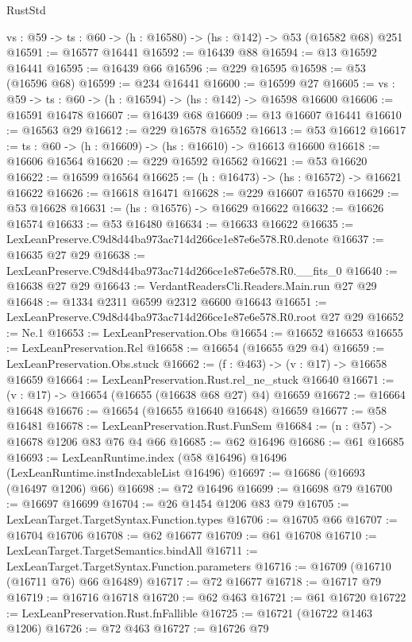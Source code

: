 \begin{lexlean}{RustStd}
\begin{coremodule}
  {vs : @59} -> {ts : @60} -> (h : @16580) -> (hs : @142) -> @53 (@16582 @68) @251
@16591 := @16577 @16441
@16592 := @16439 @88
@16594 := @13 @16592 @16441
@16595 := @16439 @66
@16596 := @229 @16595
@16598 := @53 (@16596 @68)
@16599 := @234 @16441
@16600 := @16599 @27
@16605 := {vs : @59} -> {ts : @60} -> (h : @16594) -> (hs : @142) -> @16598 @16600
@16606 := @16591 @16478
@16607 := @16439 @68
@16609 := @13 @16607 @16441
@16610 := @16563 @29
@16612 := @229 @16578 @16552
@16613 := @53 @16612
@16617 := {ts : @60} -> (h : @16609) -> (hs : @16610) -> @16613 @16600
@16618 := @16606 @16564
@16620 := @229 @16592 @16562
@16621 := @53 @16620
@16622 := @16599 @16564
@16625 := (h : @16473) -> (hs : @16572) -> @16621 @16622
@16626 := @16618 @16471
@16628 := @229 @16607 @16570
@16629 := @53 @16628
@16631 := (hs : @16576) -> @16629 @16622
@16632 := @16626 @16574
@16633 := @53 @16480
@16634 := @16633 @16622
@16635 := LexLeanPreserve.C9d8d44ba973ac714d266ce1e87e6e578.R0.denote
@16637 := @16635 @27 @29
@16638 := LexLeanPreserve.C9d8d44ba973ac714d266ce1e87e6e578.R0.__fits_0
@16640 := @16638 @27 @29
@16643 := VerdantReadersCli.Readers.Main.run @27 @29
@16648 := @1334 @2311 @6599 @2312 @6600 @16643
@16651 := LexLeanPreserve.C9d8d44ba973ac714d266ce1e87e6e578.R0.root @27 @29
@16652 := Ne.{1}
@16653 := LexLeanPreservation.Obs
@16654 := @16652 @16653
@16655 := LexLeanPreservation.Rel
@16658 := @16654 (@16655 @29 @4)
@16659 := LexLeanPreservation.Obs.stuck
@16662 := (f : @463) -> (v : @17) -> @16658 @16659
@16664 := LexLeanPreservation.Rust.rel_ne_stuck @16640
@16671 := (v : @17) -> @16654 (@16655 (@16638 @68 @27) @4) @16659
@16672 := @16664 @16648
@16676 := @16654 (@16655 @16640 @16648) @16659
@16677 := @58 @16481
@16678 := LexLeanPreservation.Rust.FunSem
@16684 := (n : @57) -> @16678 @1206 @83 @76 @4 @66
@16685 := @62 @16496
@16686 := @61 @16685
@16693 := LexLeanRuntime.index (@58 @16496) @16496 (LexLeanRuntime.instIndexableList @16496)
@16697 := @16686 (@16693 (@16497 @1206) @66)
@16698 := @72 @16496
@16699 := @16698 @79
@16700 := @16697 @16699
@16704 := @26 @1454 @1206 @83 @79
@16705 := LexLeanTarget.TargetSyntax.Function.types
@16706 := @16705 @66
@16707 := @16704 @16706
@16708 := @62 @16677
@16709 := @61 @16708
@16710 := LexLeanTarget.TargetSemantics.bindAll
@16711 := LexLeanTarget.TargetSyntax.Function.parameters
@16716 := @16709 (@16710 (@16711 @76) @66 @16489)
@16717 := @72 @16677
@16718 := @16717 @79
@16719 := @16716 @16718
@16720 := @62 @463
@16721 := @61 @16720
@16722 := LexLeanPreservation.Rust.fnFallible
@16725 := @16721 (@16722 @1463 @1206)
@16726 := @72 @463
@16727 := @16726 @79

\end{coremodule}
\end{lexlean}
